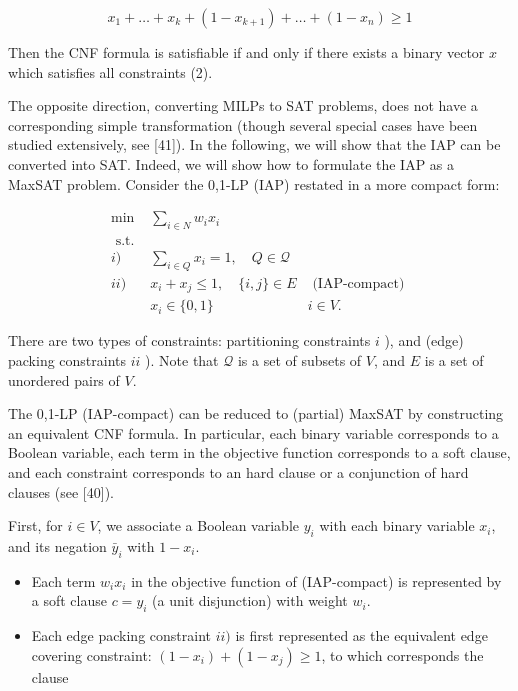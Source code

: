 \documentclass[10pt]{article}
\begin{document}
\begin{equation*}
x_{1}+\ldots+x_{k}+\left(1-x_{k+1}\right)+\ldots+\left(1-x_{n}\right) \geq 1 \tag{2}
\end{equation*}


Then the CNF formula is satisfiable if and only if there exists a binary vector $x$ which satisfies all constraints (2).

The opposite direction, converting MILPs to SAT problems, does not have a corresponding simple transformation (though several special cases have been studied extensively, see [41]). In the following, we will show that the IAP can be converted into SAT. Indeed, we will show how to formulate the IAP as a MaxSAT problem. Consider the 0,1-LP (IAP) restated in a more compact form:

$$
\begin{array}{lll}
\min & \sum_{i \in N} w_{i} x_{i} & \\
\text { s.t. } & & \\
i) & \sum_{i \in Q} x_{i}=1, \quad Q \in \mathcal{Q} & \\
i i) & x_{i}+x_{j} \leq 1, \quad\{i, j\} \in E & \text { (IAP-compact) } \\
& x_{i} \in\{0,1\} \quad & i \in V .
\end{array}
$$

There are two types of constraints: partitioning constraints $i$ ), and (edge) packing constraints $i i$ ). Note that $\mathcal{Q}$ is a set of subsets of $V$, and $E$ is a set of unordered pairs of $V$.

The 0,1-LP (IAP-compact) can be reduced to (partial) MaxSAT by constructing an equivalent CNF formula. In particular, each binary variable corresponds to a Boolean variable, each term in the objective function corresponds to a soft clause, and each constraint corresponds to an hard clause or a conjunction of hard clauses (see [40]).

First, for $i \in V$, we associate a Boolean variable $y_{i}$ with each binary variable $x_{i}$, and its negation $\bar{y}_{i}$ with $1-x_{i}$.

    \begin{itemize}
      \item Each term $w_{i} x_{i}$ in the objective function of (IAP-compact) is represented by a soft clause $c=y_{i}$ (a unit disjunction) with weight $w_{i}$.
      \item Each edge packing constraint $i i)$ is first represented as the equivalent edge covering constraint: $\left(1-x_{i}\right)+\left(1-x_{j}\right) \geq 1$, to which corresponds the clause
    \end{itemize}
\end{document}

